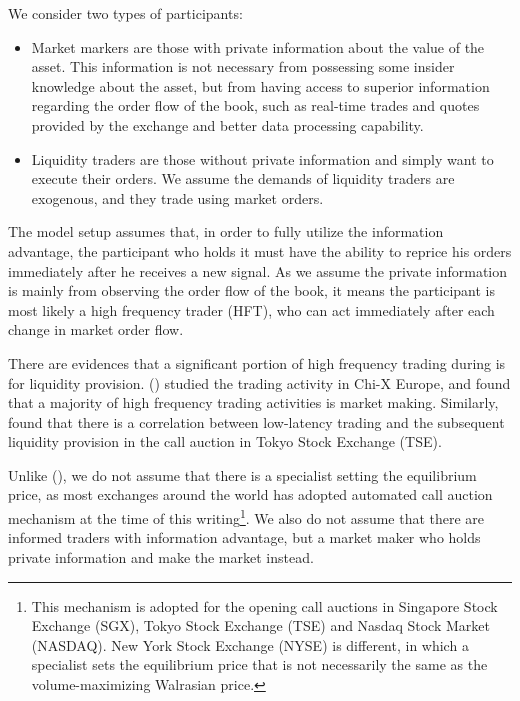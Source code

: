 We consider two types of participants:

\begin{itemize}
  \item Market markers are those with private information about the value of the asset. This information is not necessary from possessing some insider knowledge about the asset, but from having access to superior information regarding the order flow of the book, such as real-time trades and quotes provided by the exchange and better data processing capability.
  \item Liquidity traders are those without private information and simply want to execute their orders. We assume the demands of liquidity traders are exogenous, and they trade using market orders.
\end{itemize}

The model setup assumes that, in order to fully utilize the information advantage, the participant who holds it must have the ability to reprice his orders immediately after he receives a new signal. As we assume the private information is mainly from observing the order flow of the book, it means the participant is most likely a high frequency trader (HFT), who can act immediately after each change in market order flow.

There are evidences that a significant portion of high frequency trading during is for liquidity provision. (\cite{Menkveld2013}) studied the trading activity in Chi-X Europe, and found that a majority of high frequency trading activities is market making. Similarly, \cite{Bellia2017} found that there is a correlation between low-latency trading and the subsequent liquidity provision in the call auction in Tokyo Stock Exchange (TSE).

Unlike (\cite{Madhavan2015}), we do not assume that there is a specialist setting the equilibrium price, as most exchanges around the world has adopted automated call auction mechanism at the time of this writing\footnote{This mechanism is adopted for the opening call auctions in Singapore Stock Exchange (SGX), Tokyo Stock Exchange (TSE) and Nasdaq Stock Market (NASDAQ). New York Stock Exchange (NYSE) is different, in which a specialist sets the equilibrium price that is not necessarily the same as the volume-maximizing Walrasian price.}. We also do not assume that there are informed traders with information advantage, but a market maker who holds private information and make the market instead.

